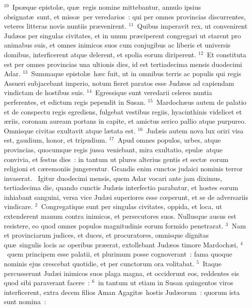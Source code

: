 ${}^{10}$~Ips\ae que epistol\ae , qu\ae\ regis nomine mittebantur, annulo ipsius obsignat\ae\ sunt, et miss\ae\ per veredarios~: qui per omnes provincias discurrentes, veteres litteras novis nuntiis pr\ae venirent.
${}^{11}$~Quibus imperavit rex, ut convenirent Jud\ae os per singulas civitates, et in unum pr\ae ciperent congregari ut starent pro animabus suis, et omnes inimicos suos cum conjugibus ac liberis et universis domibus, interficerent atque delerent, et spolia eorum diriperent.
${}^{12}$~Et constituta est per omnes provincias una ultionis dies, id est tertiadecima mensis duodecimi Adar.
${}^{13}$~Summaque epistol\ae\ h\ae c fuit, ut in omnibus terris ac populis qui regis Assueri subjacebant imperio, notum fieret paratos esse Jud\ae os ad capiendam vindictam de hostibus suis.
${}^{14}$~Egressique sunt veredarii celeres nuntia perferentes, et edictum regis pependit in Susan.
${}^{15}$~Mardoch\ae us autem de palatio et de conspectu regis egrediens, fulgebat vestibus regiis, hyacinthinis videlicet et \ae riis, coronam auream portans in capite, et amictus serico pallio atque purpureo. Omnisque civitas exultavit atque l\ae tata est.
${}^{16}$~Jud\ae is autem nova lux oriri visa est, gaudium, honor, et tripudium.
${}^{17}$~Apud omnes populos, urbes, atque provincias, quocumque regis jussa veniebant, mira exultatio, epul\ae\ atque convivia, et festus dies~: in tantum ut plures alterius gentis et sect\ae\ eorum religioni et c\ae remoniis jungerentur. Grandis enim cunctos judaici nominis terror invaserat.
~\lettrine[lines=10,image=true,loversize=0.05,lraise=-0.03]{I}{}gitur duodecimi mensis, quem Adar vocari ante jam diximus, tertiadecima die, quando cunctis Jud\ae is interfectio parabatur, et hostes eorum inhiabant sanguini, versa vice Jud\ae i superiores esse cœperunt, et se de adversariis vindicare.
${}^{2}$~Congregatique sunt per singulas civitates, oppida, et loca, ut extenderent manum contra inimicos, et persecutores suos. Nullusque ausus est resistere, eo quod omnes populos magnitudinis eorum formido penetrarat.
${}^{3}$~Nam et provinciarum judices, et duces, et procuratores, omnisque dignitas qu\ae\ singulis locis ac operibus pr\ae erat, extollebant Jud\ae os timore Mardoch\ae i,
${}^{4}$~quem principem esse palatii, et plurimum posse cognoverant~: fama quoque nominis ejus crescebat quotidie, et per cunctorum ora volitabat.
${}^{5}$~Itaque percusserunt Jud\ae i inimicos suos plaga magna, et occiderunt eos, reddentes eis quod sibi paraverant facere~:
${}^{6}$~in tantum ut etiam in Susan quingentos viros interficerent, extra decem filios Aman Agagit\ae\ hostis Jud\ae orum~: quorum ista sunt nomina~:
